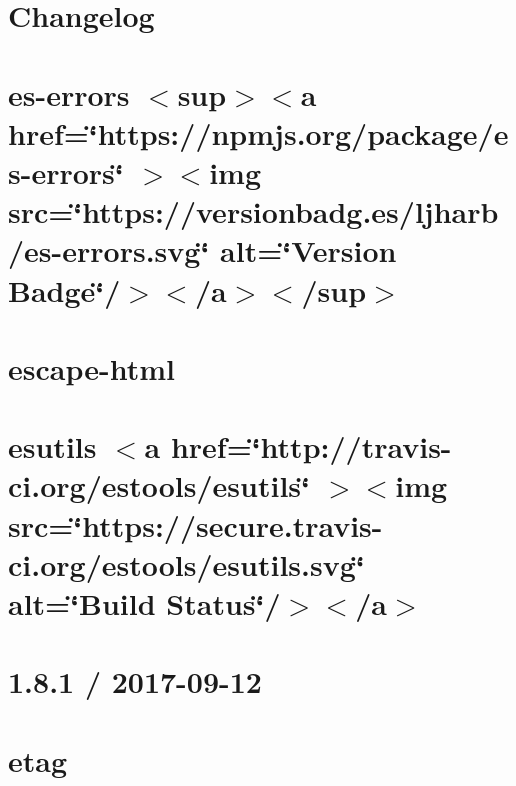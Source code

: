 \documentclass[twoside]{book}
\newcommand{\+}{\discretionary{\mbox{\scriptsize$\hookleftarrow$}}{}{}}
\begin{document}
\chapter{Changelog}
\label{md_src_nodejs_node_modules_es_errors_CHANGELOG}

\chapter{es-\/errors \texorpdfstring{$<$}{<}sup\texorpdfstring{$>$}{>}\texorpdfstring{$<$}{<}a href=\char`\"{}https\+://npmjs.\+org/package/es-\/errors\char`\"{} \texorpdfstring{$>$}{>}\texorpdfstring{$<$}{<}img src=\char`\"{}https\+://versionbadg.\+es/ljharb/es-\/errors.\+svg\char`\"{} alt=\char`\"{}\+Version Badge\char`\"{}/\texorpdfstring{$>$}{>}\texorpdfstring{$<$}{<}/a\texorpdfstring{$>$}{>}\texorpdfstring{$<$}{<}/sup\texorpdfstring{$>$}{>}}
\label{md_src_nodejs_node_modules_es_errors_README}

\chapter{escape-\/html}
\label{md_src_nodejs_node_modules_escape_html_Readme}

\chapter{esutils \texorpdfstring{$<$}{<}a href=\char`\"{}http\+://travis-\/ci.\+org/estools/esutils\char`\"{} \texorpdfstring{$>$}{>}\texorpdfstring{$<$}{<}img src=\char`\"{}https\+://secure.\+travis-\/ci.\+org/estools/esutils.\+svg\char`\"{} alt=\char`\"{}\+Build Status\char`\"{}/\texorpdfstring{$>$}{>}\texorpdfstring{$<$}{<}/a\texorpdfstring{$>$}{>}}
\label{md_src_nodejs_node_modules_esutils_README}

\chapter{1.8.1 / 2017-\/09-\/12}
\label{md_src_nodejs_node_modules_etag_HISTORY}

\chapter{etag}
\label{md_src_nodejs_node_modules_etag_README}

\end{document}
